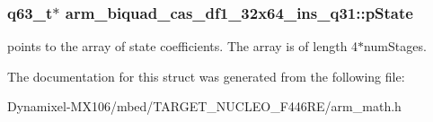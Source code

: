 \subsubsection[{\texorpdfstring{p\+State}{pState}}]{\setlength{\rightskip}{0pt plus 5cm}q63\+\_\+t$\ast$ arm\+\_\+biquad\+\_\+cas\+\_\+df1\+\_\+32x64\+\_\+ins\+\_\+q31\+::p\+State}\hypertarget{structarm__biquad__cas__df1__32x64__ins__q31_a4c899cdfaf2bb955323e93637bd662e0}{}\label{structarm__biquad__cas__df1__32x64__ins__q31_a4c899cdfaf2bb955323e93637bd662e0}
points to the array of state coefficients. The array is of length 4$\ast$num\+Stages. 

The documentation for this struct was generated from the following file\+:\begin{DoxyCompactItemize}
\item 
Dynamixel-\/\+M\+X106/mbed/\+T\+A\+R\+G\+E\+T\+\_\+\+N\+U\+C\+L\+E\+O\+\_\+\+F446\+R\+E/arm\+\_\+math.\+h\end{DoxyCompactItemize}
